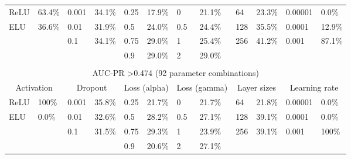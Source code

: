 \documentclass[ppgc, diss, english]{iiufrgs}
\begin{document}
\begin{table}[!th]
\begin{adjustbox}{scale=0.9,center}
\begin{tabular}{llllllllllll}
ReLU          & 63.4\%         & 0.001        & 34.1\%       & 0.25           & 17.9\%          & 0             & 21.1\%           & 64            & 23.3\%          & 0.00001          & 0.0\%          \\
ELU           & 36.6\%         & 0.01         & 31.9\%       & 0.5            & 24.0\%          & 0.5           & 24.4\%           & 128           & 35.5\%          & 0.0001           & 12.9\%         \\
              &                & 0.1          & 34.1\%       & 0.75           & 29.0\%          & 1             & 25.4\%           & 256           & 41.2\%          & 0.001            & 87.1\%         \\
              &                &              &              & 0.9            & 29.0\%          & 2             & 29.0\%           &               &                 &                  &                \\
              &                &              &              &                &                 &               &                  &               &                 &                  &                \\ \hline
\multicolumn{12}{c}{AUC-PR \textgreater 0.474 (92 parameter combinations)}                                                                                                                               \\ \hline
\multicolumn{2}{c}{Activation} & \multicolumn{2}{c}{Dropout} & \multicolumn{2}{c}{Loss (alpha)} & \multicolumn{2}{c}{Loss (gamma)} & \multicolumn{2}{c}{Layer sizes} & \multicolumn{2}{c}{Learning rate} \\
ReLU          & 100\%          & 0.001        & 35.8\%       & 0.25           & 21.7\%          & 0             & 21.7\%           & 64            & 21.8\%          & 0.00001          & 0.0\%          \\
ELU           & 0.0\%          & 0.01         & 32.6\%       & 0.5            & 28.2\%          & 0.5           & 27.1\%           & 128           & 39.1\%          & 0.0001           & 0.0\%          \\
              &                & 0.1          & 31.5\%       & 0.75           & 29.3\%          & 1             & 23.9\%           & 256           & 39.1\%          & 0.001            & 100\%          \\
              &                &              &              & 0.9            & 20.6\%          & 2             & 27.1\%           &               &                 &                  &                \\ \hline
\end{tabular}
\end{adjustbox}
\end{table}
\end{document}
